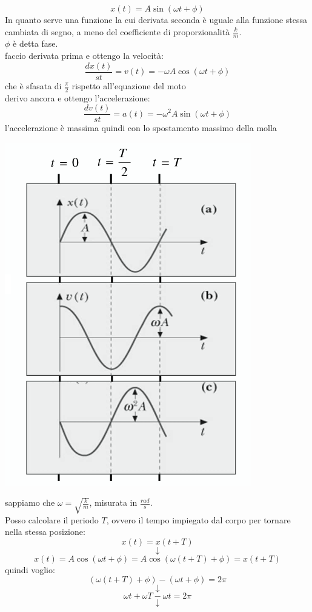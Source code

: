 \documentclass[a4paper,12pt, oneside]{book}
\begin{document}
$$x(t)=A\sin(\omega t+\phi)$$
In quanto serve una funzione la cui derivata seconda è uguale alla funzione stessa cambiata di segno, a meno del coefficiente di proporzionalità $\frac{k}{m}$.\\
$\phi$ è detta fase.
\\faccio derivata prima e ottengo la velocità:
$$\frac{dx(t)}{st}=v(t)=-\omega A\cos(\omega t+\phi)$$
che è sfasata di $\frac{\pi}{2}$ rispetto all'equazione del moto
\\derivo ancora e ottengo l'accelerazione:
$$\frac{dv(t)}{st}=a(t)=-\omega^2A\sin(\omega t+\phi)$$
l'accelerazione è massima quindi con lo spostamento massimo della molla
\begin{center}
\includegraphics[scale=0.7]{img/arm.png}
\end{center}
sappiamo che $\omega=\sqrt{\frac{k}{m}}$, misurata in $\frac{rad}{s}$.
\\Posso calcolare il periodo $T$, ovvero il tempo impiegato dal corpo per tornare nella stessa posizione:
$$x(t)=x(t+T)$$
$$\downarrow$$
$$x(t)=A\cos(\omega t+\phi)=A\cos(\omega (t+T)+\phi)=x(t+T)$$
quindi voglio:
$$(\omega(t+T)+\phi)-(\omega t+\phi)=2\pi$$
$$\downarrow$$
$$\omega t+\omega T-\omega t= 2\pi$$
$$\downarrow$$
\end{document}
